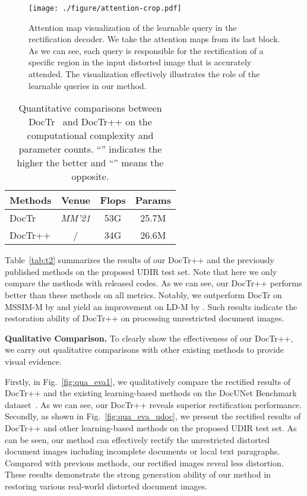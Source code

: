 \documentclass[lettersize,journal]{IEEEtran}
\begin{document}
\begin{figure}[t]
  \centering
  \texttt{[image: ./figure/attention-crop.pdf]}
  \caption{Attention map visualization of the learnable query in the rectification decoder. We take the attention maps from its last block. As we can see, each query is responsible for the rectification of a specific region in the input distorted image that is accurately attended. 
  The visualization effectively illustrates the role of the learnable queries in our method.}
  \label{fig:attention}
\end{figure}

\setlength{\tabcolsep}{4.8mm}
\begin{table}[t]
\centering
	\caption{Quantitative comparisons between DocTr~\cite{feng2021doctr} and DocTr++ on the computational complexity and parameter counts. ``'' indicates the higher the better and ``'' means the opposite.}
\begin{tabular}{l|c|cc} 
   \toprule
   \textbf{Methods} & \textbf{Venue} &\textbf{Flops}  & \textbf{Params}   \\ 
   \midrule

    DocTr~\cite{feng2021doctr} & \emph{MM'21} & 53G & 25.7M \\

    \midrule
    DocTr++ & / & 34G & 26.6M  \\
   \bottomrule
\end{tabular}
\label{tab:eff}
\end{table} 


Table~\ref{tab:t2} summarizes the results of our DocTr++ and the previously published methods on the proposed UDIR test set.
Note that here we only compare the methods with released codes.
As we can see,
our DocTr++ performs better than these methods on all metrics.
Notably, we outperform DocTr on MSSIM-M by  and yield an improvement on LD-M by .
Such results indicate the restoration ability of DocTr++ on processing unrestricted document images.


\smallskip
\textbf{Qualitative Comparison.}
To clearly show the effectiveness of our DocTr++, we carry out qualitative comparisons with other existing methods to provide visual evidence.

Firstly, in Fig.~\ref{fig:qua_eva1}, we qualitatively compare the rectified results of DocTr++ and the existing learning-based methods on the DocUNet Benchmark dataset~\cite{8578592}.
As we can see, our DocTr++ reveals superior rectification performance.
Secondly, as shown in Fig.~\ref{fig:qua_eva_udoc}, we present the rectified results of DocTr++ and other learning-based methods on the proposed UDIR test set. As can be seen, our method can effectively rectify the unrestricted distorted document images including incomplete documents or local text paragraphs.
Compared with previous methods, our rectified images reveal less distortion.
These results demonstrate the strong generation ability of our method in restoring various real-world distorted document images.
\end{document}
